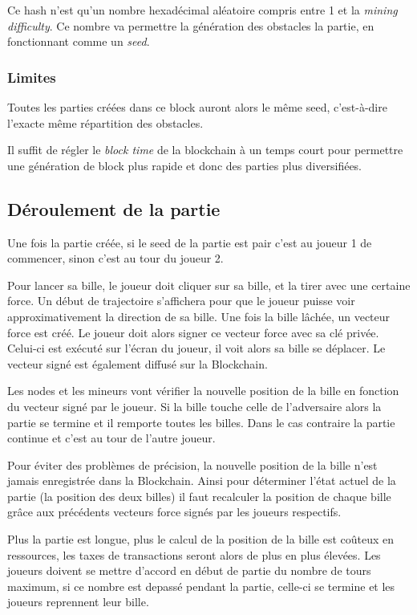 \documentclass{article}
\begin{document}
Ce hash n'est qu'un nombre hexadécimal aléatoire compris entre 1 et la \textit{mining difficulty}. Ce nombre va permettre la génération des obstacles la partie, en fonctionnant comme un \textit{seed}.

\subsubsection{Limites}
Toutes les parties créées dans ce block auront alors le même seed, c'est-à-dire l'exacte même répartition des obstacles.  

Il suffit de régler le \textit{block time} de la blockchain à un temps court pour permettre une génération de block plus rapide et donc des parties plus diversifiées. 

\subsection{Déroulement de la partie}
Une fois la partie créée, si le seed de la partie est pair c'est au joueur 1 de commencer, sinon c'est au tour du joueur 2.

Pour lancer sa bille, le joueur doit cliquer sur sa bille, et la tirer avec une certaine force. Un début de trajectoire s'affichera pour que le joueur puisse voir approximativement la direction de sa bille.
Une fois la bille lâchée, un vecteur force est créé. Le joueur doit alors signer ce vecteur force avec sa clé privée. Celui-ci est exécuté sur l'écran du joueur, il voit alors sa bille se déplacer. Le vecteur signé est également diffusé sur la Blockchain.

Les nodes et les mineurs vont vérifier la nouvelle position de la bille en fonction du vecteur signé par le joueur. Si la bille touche celle de l'adversaire alors la partie se termine et il remporte toutes les billes. Dans le cas contraire la partie continue et c'est au tour de l'autre joueur.

Pour éviter des problèmes de précision, la nouvelle position de la bille n'est jamais enregistrée dans la Blockchain. Ainsi pour déterminer l'état actuel de la partie (la position des deux billes) il faut recalculer la position de chaque bille grâce aux précédents vecteurs force signés par les joueurs respectifs.

Plus la partie est longue, plus le calcul de la position de la bille est coûteux en ressources, les taxes de transactions seront alors de plus en plus élevées. Les joueurs doivent se mettre d'accord en début de partie du nombre de tours maximum, si ce nombre est depassé pendant la partie, celle-ci se termine et les joueurs reprennent leur bille.
\end{document}
